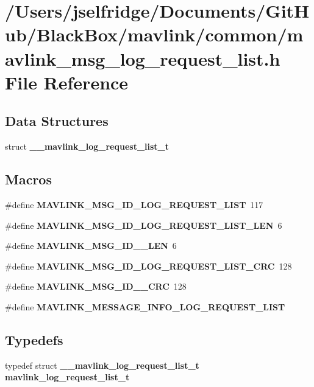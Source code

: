 \section{/\+Users/jselfridge/\+Documents/\+Git\+Hub/\+Black\+Box/mavlink/common/mavlink\+\_\+msg\+\_\+log\+\_\+request\+\_\+list.h File Reference}
\label{mavlink__msg__log__request__list_8h}
\subsection*{Data Structures}
\begin{DoxyCompactItemize}
\item 
struct \textbf{ \+\_\+\+\_\+mavlink\+\_\+log\+\_\+request\+\_\+list\+\_\+t}
\end{DoxyCompactItemize}
\subsection*{Macros}
\begin{DoxyCompactItemize}
\item 
\#define \textbf{ M\+A\+V\+L\+I\+N\+K\+\_\+\+M\+S\+G\+\_\+\+I\+D\+\_\+\+L\+O\+G\+\_\+\+R\+E\+Q\+U\+E\+S\+T\+\_\+\+L\+I\+ST}~117
\item 
\#define \textbf{ M\+A\+V\+L\+I\+N\+K\+\_\+\+M\+S\+G\+\_\+\+I\+D\+\_\+\+L\+O\+G\+\_\+\+R\+E\+Q\+U\+E\+S\+T\+\_\+\+L\+I\+S\+T\+\_\+\+L\+EN}~6
\item 
\#define \textbf{ M\+A\+V\+L\+I\+N\+K\+\_\+\+M\+S\+G\+\_\+\+I\+D\+\_\+\_\+\+L\+EN}~6
\item 
\#define \textbf{ M\+A\+V\+L\+I\+N\+K\+\_\+\+M\+S\+G\+\_\+\+I\+D\+\_\+\+L\+O\+G\+\_\+\+R\+E\+Q\+U\+E\+S\+T\+\_\+\+L\+I\+S\+T\+\_\+\+C\+RC}~128
\item 
\#define \textbf{ M\+A\+V\+L\+I\+N\+K\+\_\+\+M\+S\+G\+\_\+\+I\+D\+\_\+\_\+\+C\+RC}~128
\item 
\#define \textbf{ M\+A\+V\+L\+I\+N\+K\+\_\+\+M\+E\+S\+S\+A\+G\+E\+\_\+\+I\+N\+F\+O\+\_\+\+L\+O\+G\+\_\+\+R\+E\+Q\+U\+E\+S\+T\+\_\+\+L\+I\+ST}
\end{DoxyCompactItemize}
\subsection*{Typedefs}
\begin{DoxyCompactItemize}
\item 
typedef struct \textbf{ \+\_\+\+\_\+mavlink\+\_\+log\+\_\+request\+\_\+list\+\_\+t} \textbf{ mavlink\+\_\+log\+\_\+request\+\_\+list\+\_\+t}
\end{DoxyCompactItemize}


